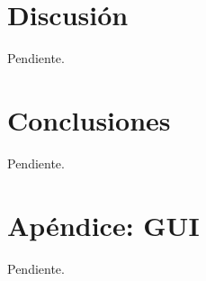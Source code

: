 \documentclass[a4paper, 10pt, twoside]{article}
\begin{document}
\section{Discusión}

Pendiente.




\section{Conclusiones}

Pendiente.




\section{Apéndice: GUI}

Pendiente.
\end{document}

